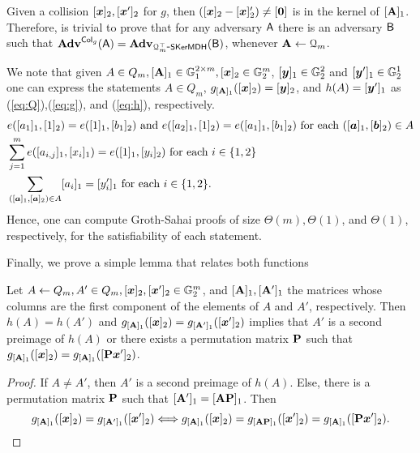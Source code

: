 Given a collision $[{\boldsymbol{x}}]_2,[{\boldsymbol{x}}']_2$ for $g$, then $([{\boldsymbol{x}}]_2-[{\boldsymbol{x}}]'_2)\neq [{\boldsymbol{0}}]$ is in the kernel of $[\mathbf{{A}}]_1$. Therefore, is trivial to prove that for any adversary $\mathsf{A}$ there is an adversary $\mathsf{B}$ such that $\mathbf{Adv}^{\mathsf{Col}_g}(\mathsf{A})=\mathbf{Adv}_{\mathcal{Q}_m^\top\mbox{-}\mathsf{SKerMDH}}(\mathsf{B})$, whenever $\mathbf{{A}}\gets\mathcal{Q}_m$.

We note that given $A\in Q_m,[\mathbf{{A}}]_1\in\mathbb{G}^{2\times m}_1,[{\boldsymbol{x}}]_2\in\mathbb{G}^m_2$, $[{\boldsymbol{y}}]_1\in\mathbb{G}_2^2$ and $[{\boldsymbol{y}}']_1\in\mathbb{G}^1_2$ one can express the statements $A\in Q_m$, $g_{[\mathbf{{A}}]_1}([{\boldsymbol{x}}]_2)=[{\boldsymbol{y}}]_2$, and $h(A)=[{\boldsymbol{y}}']_1$ as (\ref{eq:Q}),(\ref{eq:g}), and (\ref{eq:h}), respectively.
 \begin{align}
&e([a_{1}]_1,[1]_2) = e([1]_1,[{b}_1]_2)\text{ and }e([a_{2}]_1,[1]_2)=e([a_{1}]_1,[b_1]_2)
\text{ for each }([{\boldsymbol{a}}]_1,[{\boldsymbol{b}}]_2)\in A \label{eq:Q}\\
&\sum_{j=1}^m e([a_{i,j}]_1,[x_i]_1) = e([1]_1,[y_i]_2) \text{ for each } i\in\{1,2\} \label{eq:g}\\
&\sum_{([{\boldsymbol{a}}]_1,[{\boldsymbol{a}}]_2)\in A} [a_i]_1 = [y'_i]_1 \text{ for each } i\in\{1,2\}.\label{eq:h}
\end{align}
Hence, one can compute Groth-Sahai proofs of size $\Theta(m),\Theta(1)$, and $\Theta(1)$, respectively, for the satisfiability of each statement.

Finally, we prove a simple lemma that relates both functions
\begin{lemma}\label{lemma:hg}
Let $A\gets Q_m,A'\in Q_m,[{\boldsymbol{x}}]_2,[{\boldsymbol{x}}']_2\in\mathbb{G}^m_2$, and $[\mathbf{{A}}]_1,[\mathbf{{A}}']_1$ the matrices whose columns are the first component of the elements of $A$ and $A'$, respectively. Then $h(A)=h(A')$ and $g_{[\mathbf{{A}}]_1}([{\boldsymbol{x}}]_2)=g_{[\mathbf{{A}}']_1}([{\boldsymbol{x}}']_2)$ implies that $A'$ is a second preimage of $h(A)$ or there exists a permutation matrix $\mathbf{{P}}$ such that $g_{[\mathbf{{A}}]_1}([{\boldsymbol{x}}]_2)=g_{[\mathbf{{A}}]_1}([\mathbf{{P}}{\boldsymbol{x}}']_2)$.
\end{lemma}
\begin{proof}
If $A\neq A'$, then $A'$ is a second preimage of $h(A)$. Else, there is a permutation matrix $\mathbf{{P}}$ such that $[\mathbf{{A}}']_1 =[\mathbf{{A}}\mathbf{{P}}]_1$. Then
$$
 g_{[\mathbf{{A}}]_1}([{\boldsymbol{x}}]_2)=g_{[\mathbf{{A}}']_1}([{\boldsymbol{x}}']_2)\Longleftrightarrow  g_{[\mathbf{{A}}]_1}([{\boldsymbol{x}}]_2)=g_{[\mathbf{{A}}\mathbf{{P}}]_1}([{\boldsymbol{x}}']_2)=g_{[\mathbf{{A}}]_1}([\mathbf{{P}}{\boldsymbol{x}}']_2).
$$
\end{proof}